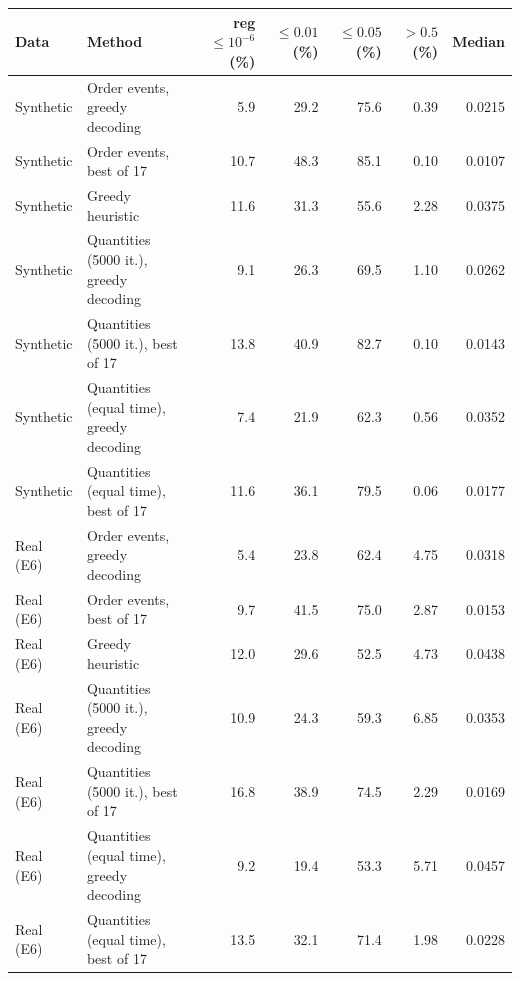 \begin{tabular}{llrrrrr}
\toprule
Data & Method & reg $\le10^{-6}$ (\%) & $\le0.01$ (\%) & $\le0.05$ (\%) & $>0.5$ (\%) & Median\\
\midrule
Synthetic & Order events, greedy decoding & 5.9 & 29.2 & 75.6 & 0.39 & 0.0215\\
Synthetic & Order events, best of 17 & 10.7 & 48.3 & 85.1 & 0.10 & 0.0107\\
Synthetic & Greedy heuristic & 11.6 & 31.3 & 55.6 & 2.28 & 0.0375\\
Synthetic & Quantities (5000 it.), greedy decoding & 9.1 & 26.3 & 69.5 & 1.10 & 0.0262\\
Synthetic & Quantities (5000 it.), best of 17 & 13.8 & 40.9 & 82.7 & 0.10 & 0.0143\\
Synthetic & Quantities (equal time), greedy decoding & 7.4 & 21.9 & 62.3 & 0.56 & 0.0352\\
Synthetic & Quantities (equal time), best of 17 & 11.6 & 36.1 & 79.5 & 0.06 & 0.0177\\
\midrule
Real (E6) & Order events, greedy decoding & 5.4 & 23.8 & 62.4 & 4.75 & 0.0318\\
Real (E6) & Order events, best of 17 & 9.7 & 41.5 & 75.0 & 2.87 & 0.0153\\
Real (E6) & Greedy heuristic & 12.0 & 29.6 & 52.5 & 4.73 & 0.0438\\
Real (E6) & Quantities (5000 it.), greedy decoding & 10.9 & 24.3 & 59.3 & 6.85 & 0.0353\\
Real (E6) & Quantities (5000 it.), best of 17 & 16.8 & 38.9 & 74.5 & 2.29 & 0.0169\\
Real (E6) & Quantities (equal time), greedy decoding & 9.2 & 19.4 & 53.3 & 5.71 & 0.0457\\
Real (E6) & Quantities (equal time), best of 17 & 13.5 & 32.1 & 71.4 & 1.98 & 0.0228\\
\bottomrule
\end{tabular}
